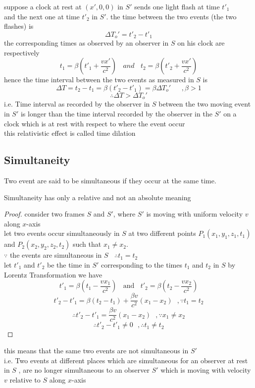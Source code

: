 \documentclass{article}
\begin{document}
suppose a clock at rest at $(x',0,0)$ in $S'$ 
sends one light flash at time $t'_1$\\
and the next one at time $t'_2$ in $S'$. the time between the two events (the two flashes) is 
\[
\Delta T_o' = t'_2 - t'_1
\]
the corresponding times as observed by an observer in $S$ on his clock are respectively
\[
t_1 = \beta\left(t'_1 + \frac{vx'}{c^2}\right) \ \ \ \ and  \ \ \ \ t_2 = \beta\left(t'_2 + \frac{vx'}{c^2}\right)
\]
hence the time interval between the two events as measured in $S$ is 
\[
\Delta T = t_2-t_1 = \beta (t'_2-t'_1) = \beta\Delta T_o' \ \ \ \ \ \ \ ,\beta>1
\]
\[
\therefore \Delta T > \Delta T_o'
\]
i.e. Time interval as recorded by the observer in $S$ between the two moving event in $S'$ is longer than the time interval recorded by the observer in the $S'$
on a clock which is at rest with respect to where the event occur \\
this relativistic effect is called time dilation

\subsection{Simultaneity}
\hfill
\begin{definition}
    Two event are said to be simultaneous if they occur at the same time.    
\end{definition}
\begin{theorem}
    Simultaneity has only a relative and not an absolute meaning
\end{theorem}
\begin{proof}
consider two frames $S$ and $S'$, where $S'$ is moving with uniform velocity $v$ along $x$-axis\\
let two events occur simultaneously in $S$ at two different points $P_1(x_1,y_1,z_1,t_1)$ and $P_2(x_2,y_2,z_2,t_2)$
such that $x_1 \neq x_2 $.\\
$\because$ the events are simultaneous in $S \ \ \ \ \therefore t_1=t_2$\\
let $t'_1$ and $t'_2$ be the time in $S'$ corresponding to the times $t_1$ and $t_2$ in $S$ by Lorentz Transformation we have 
\[
    t'_1 = \beta\left(t_1 - \frac{vx_1}{c^2}\right) \ \ \ \ \text{and}  \ \ \ \ t'_2 = \beta\left(t_2 - \frac{vx_2}{c^2}\right)
\]
\[
t'_2 -t'_1 = \beta(t_2-t_1) + \frac{\beta v}{c^2}(x_1-x_2) \ \ \ ,\because t_1=t_2
\]
\[
\therefore t'_2 -t'_1 = \frac{\beta v}{c^2}(x_1-x_2) \ \ \ ,\because x_1 \neq x_2
\]
\[
\therefore t'_2 -t'_1 \neq 0  \ \ \ ,\therefore t_1 \neq t_2
\]
\end{proof}
this means that the same two events are not simultaneous in $S'$\\
i.e. Two events at different places which are simultaneous for an observer at rest in $S$ , are no longer simultaneous to an observer $S'$ which is moving with velocity $v$ relative to $S$ along $x$-axis
\end{document}
